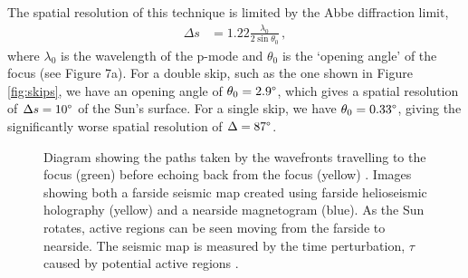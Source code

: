 \documentclass[11pt,a4paper,onecolumn]{report}
\begin{document}
\noindent The spatial resolution of this technique is limited by the Abbe
diffraction limit,
\begin{align}
  \Delta s &= 1.22\frac{\lambda_0}{2 \sin{\theta_0}}\,,
\end{align}
where \(\lambda_0\) is the wavelength of the p-mode and \(\theta_0\) is the
`opening angle' of the focus (see Figure 7a). For a double skip,
such as the one shown in Figure \ref{fig:skips}, we have an opening angle of
\(\theta_0 =2.9\degree\), which gives a spatial resolution of \(\Delta s =
10\degree\) of the Sun's surface. For a single skip, we have \(\theta_0
=0.33\degree\), giving the significantly worse spatial resolution of \(\Delta =
87\degree\). \\

\begin{figure}[t]%
  \centering
  \qquad
  \caption[]{
     Diagram showing the paths taken by the wavefronts
    travelling to the focus (green) before echoing back from the focus (yellow)
    \citep{Lindsey2011}. Images showing both a farside seismic map created using
    farside helioseismic holography (yellow) and a nearside magnetogram (blue).
    As the Sun rotates, active regions can be seen moving from the farside to
    nearside. The seismic map is measured by the time perturbation, \(\tau\) caused by
    potential active regions \citep{Lindsey2017}.
    }
\end{figure}
\end{document}
